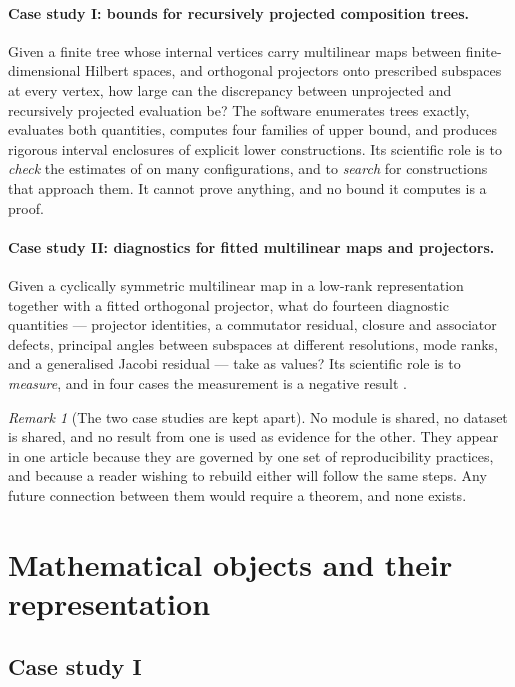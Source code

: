 \documentclass[11pt]{amsart}
\theoremstyle{remark}
\newtheorem{remark}{Remark}[section]
\begin{document}
\paragraph{Case study I: bounds for recursively projected composition trees.}
Given a finite tree whose internal vertices carry multilinear maps between
finite-dimensional Hilbert spaces, and orthogonal projectors onto prescribed subspaces at
every vertex, how large can the discrepancy between unprojected and recursively projected
evaluation be? The software enumerates trees exactly, evaluates both quantities, computes
four families of upper bound, and produces rigorous interval enclosures of explicit lower
constructions. Its scientific role is to \emph{check} the estimates of
\cite{ChaveroJassoTrees} on many configurations, and to \emph{search} for constructions that
approach them. It cannot prove anything, and no bound it computes is a proof.

\paragraph{Case study II: diagnostics for fitted multilinear maps and projectors.}
Given a cyclically symmetric multilinear map in a low-rank representation together with a
fitted orthogonal projector, what do fourteen diagnostic quantities --- projector
identities, a commutator residual, closure and associator defects, principal angles between
subspaces at different resolutions, mode ranks, and a generalised Jacobi residual --- take
as values? Its scientific role is to \emph{measure}, and in four cases the measurement is a
negative result \cite{ChaveroJassoNumerical}.

\begin{remark}[The two case studies are kept apart]
\label{rem:separate}
No module is shared, no dataset is shared, and no result from one is used as evidence for
the other. They appear in one article because they are governed by one set of
reproducibility practices, and because a reader wishing to rebuild either will follow the
same steps. Any future connection between them would require a theorem, and none exists.
\end{remark}

\section{Mathematical objects and their representation}
\label{sec:objects}

\subsection{Case study I}
\end{document}
